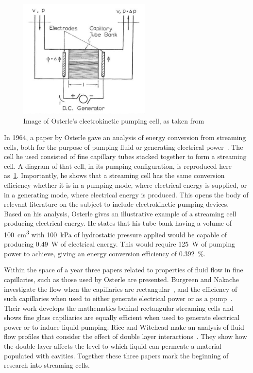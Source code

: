     \begin{figure}
      \centering
      \includegraphics[height=6cm]{content/pt1/Osterle_ElectrokineticCell.png}
      \caption{\label{fig:Osterle_cell}Image of Osterle's electrokinetic pumping cell, as taken from \cite{Osterle1964}}
    \end{figure}
    In 1964, a paper by Osterle gave an analysis of energy conversion from streaming cells, both for the purpose of pumping fluid or generating electrical power~\cite{Osterle1964}.
    The cell he used consisted of fine capillary tubes stacked together to form a streaming cell.
    A diagram of that cell, in its pumping configuration, is reproduced here as~\cref{fig:Osterle_cell}.
    Importantly, he shows that a streaming cell has the same conversion efficiency whether it is in a pumping mode, where electrical energy is supplied, or in a generating mode, where electrical energy is produced.
    This opens the body of relevant literature on the subject to include electrokinetic pumping devices.
    Based on his analysis, Osterle gives an illustrative example of a streaming cell producing electrical energy.
    He states that his tube bank having a volume of \SI{100}{\centi\meter\cubed} with \SI{100}{\kilo\pascal} of hydrostatic pressure applied would be capable of producing \SI{0.49}{\watt} of electrical energy.
    This would require \SI{125}{\watt} of pumping power to achieve, giving an energy conversion efficiency of \SI{0.392}{\percent}.


    Within the space of a year three papers related to properties of fluid flow in fine capillaries, such as those used by Osterle are presented.
    Burgreen and Nakache investigate the flow when the capillaries are rectangular~\cite{Burgreen1964}, and the efficiency of such capillaries when used to either generate electrical power or as a pump~\cite{Burgreen1965}.
    Their work develops the mathematics behind rectangular streaming cells and shows fine glass capiliaries are equally efficient when used to generate electrical power or to induce liquid pumping.
    Rice and Witehead make an analysis of fluid flow profiles that consider the effect of double layer interactions~\cite{Rice1965}.
    They show how the double layer affects the level to which liquid can permeate a material populated with cavities.
    Together these three papers mark the beginning of research into streaming cells.

